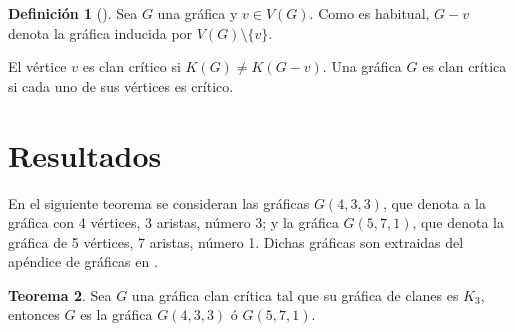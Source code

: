\documentclass[12pt]{book}
\theoremstyle{definition}
\newtheorem{theorem}{Teorema}[chapter]
\newtheorem{definition}[theorem]{Definición}
\begin{document}
\begin{definition}[\citealt{Alcon:2006}]
Sea $G$ una gráfica y $v \in V(G)$. Como es habitual, $G-v$ denota la gráfica inducida por $V(G)\setminus \{v\}$.  

El vértice $v$ es clan crítico si $K(G)\neq K(G-v)$. Una gráfica $G$ es clan crítica si cada uno de sus vértices es crítico.
\end{definition}



\section*{Resultados}

En el siguiente teorema se consideran las gráficas $G(4,3,3)$, que denota a la gráfica con 4 vértices, 3 aristas, número 3; y la gráfica $G(5,7,1)$, que denota la gráfica de 5 vértices, 7 aristas, número 1. Dichas gráficas son extraidas del apéndice de gráficas en \cite{Harary:1969}.
\begin{theorem}
	Sea $G$ una gráfica clan crítica tal que su gráfica de clanes es $K_3$, entonces $G$ es la gráfica $G(4,3,3)$ ó $G(5,7,1)$.
\end{theorem}
\end{document}
